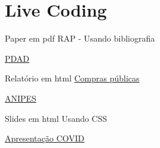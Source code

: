 \documentclass[
  9pt,
  ignorenonframetext,
]{beamer}
\begin{document}
\hypertarget{live-coding}{%
\section{Live Coding}\label{live-coding}}

\begin{frame}{Paper em pdf}
\protect\hypertarget{paper-em-pdf}{}
RAP - Usando bibliografia

\href{http://www.codeplan.df.gov.br/wp-content/uploads/2020/06/Itapo\%C3\%A3.pdf}{PDAD}
\end{frame}

\begin{frame}{Relatório em html}
\protect\hypertarget{relatuxf3rio-em-html}{}
\href{http://www.codeplan.df.gov.br/wp-content/uploads/2018/02/Cartografia-das-compras-p\%C3\%BAblicas-de-bens-e-servi\%C3\%A7os-privados-no-DF.html}{Compras
públicas}

\href{https://rpubs.com/fredbsr/ANIPES}{ANIPES}
\end{frame}

\begin{frame}{Slides em html}
\protect\hypertarget{slides-em-html}{}
Usando CSS

\href{https://github.com/fredbsr/covid19br_OP}{Apresentação COVID}
\end{frame}
\end{document}
